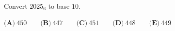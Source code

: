 Convert $2025_6$ to base $10$.

$\textbf{(A)}~450\qquad\textbf{(B)}~447\qquad\textbf{(C)}~451\qquad\textbf{(D)}~448\qquad\textbf{(E)}~449\qquad$
